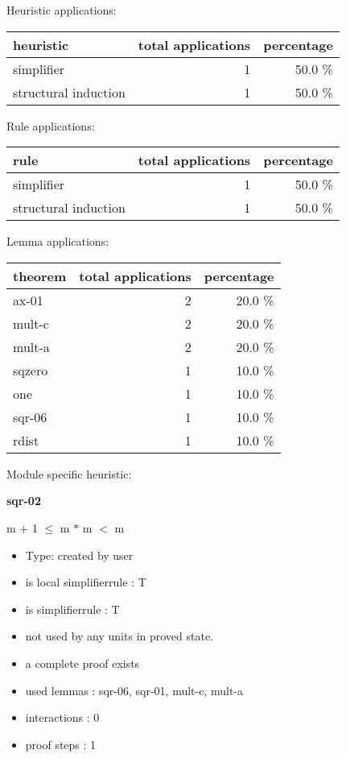 \documentclass[a4paper]{article}
\begin{document}
\medskip


Heuristic applications:

\begin{supertabular}{l|r|r}
heuristic	& total applications & percentage \\ \hline
simplifier & 1 & 50.0 \% \\
structural induction & 1 & 50.0 \% \\

\end{supertabular}

Rule applications:

\begin{supertabular}{l|r|r}
rule	        & total applications & percentage \\ \hline
simplifier & 1 & 50.0 \% \\
structural induction & 1 & 50.0 \% \\

\end{supertabular}

Lemma applications:

\begin{supertabular}{l|r|r}
theorem	        & total applications & percentage \\ \hline
ax-01 & 2 & 20.0 \% \\
mult-c & 2 & 20.0 \% \\
mult-a & 2 & 20.0 \% \\
sqzero & 1 & 10.0 \% \\
one & 1 & 10.0 \% \\
sqr-06 & 1 & 10.0 \% \\
rdist & 1 & 10.0 \% \\

\end{supertabular}

Module specific heuristic:

\pagebreak

{\LARGE\bf sqr-02}\label{lemma-sqr-02}

\medskip

 \Fol m + 1 $\le$ m $*$ m  $<$ m

\begin{itemize}

\item Type: created by user

\item is local simplifierrule : T
\item is simplifierrule : T
\item not used by any units in proved state.
\item       a complete proof exists
\item       used lemmas  : sqr-06, sqr-01, mult-c, mult-a
\item       interactions : 0
\item       proof steps  : 1
\end{itemize}
\end{document}
